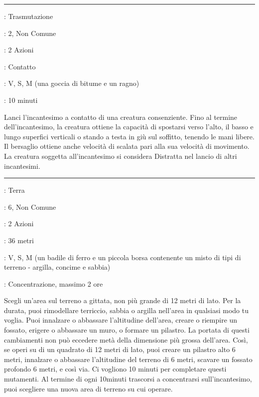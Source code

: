 \begin{multicols}{2}
\smallskip\noindent\rule{\linewidth}{2pt} \hypertarget{Movimenti del Ragno}{}\medskip{}
\noindent
\begin{description}[noitemsep, topsep=0pt, parsep=0pt, partopsep=0pt, leftmargin=0cm, labelwidth=2.8cm]
	\item[\textbf{Lista di Magia}]: Trasmutazione
	\item[\textbf{Livello}]: 2, Non Comune
	\item[\textbf{T. di Lancio}]: 2 Azioni
	\item[\textbf{Gittata}]: Contatto
	\item[\textbf{Componenti}]: V, S, M (una goccia di bitume e un ragno)
	\item[\textbf{Durata}]: 10 minuti
\end{description}

Lanci l'incantesimo a contatto di una creatura consenziente. Fino al termine dell'incantesimo, la creatura ottiene la capacità di spostarsi verso l'alto, il basso e lungo superfici verticali o stando a testa in giù sul soffitto, tenendo le mani libere. Il bersaglio ottiene anche velocità di scalata pari alla sua velocità di movimento. La creatura soggetta all'incantesimo si considera Distratta nel lancio di altri incantesimi.

\smallskip\noindent\rule{\linewidth}{2pt} \hypertarget{Muovere il Terreno}{}\medskip{}
\noindent
\begin{description}[noitemsep, topsep=0pt, parsep=0pt, partopsep=0pt, leftmargin=0cm, labelwidth=2.8cm]
	\item[\textbf{Lista di Magia}]: Terra
	\item[\textbf{Livello}]: 6, Non Comune
	\item[\textbf{T. di Lancio}]: 2 Azioni
	\item[\textbf{Gittata}]: 36 metri
	\item[\textbf{Componenti}]: V, S, M (un badile di ferro e un piccola borsa contenente un misto di tipi di terreno - argilla, concime e sabbia)
	\item[\textbf{Durata}]: Concentrazione, massimo 2 ore
\end{description}

Scegli un'area sul terreno a gittata, non più grande di 12 metri di lato. Per la durata, puoi rimodellare terriccio, sabbia o argilla nell'area in qualsiasi modo tu voglia. Puoi innalzare o abbassare l'altitudine dell'area, creare o riempire un fossato, erigere o abbassare un muro, o formare un pilastro. La portata di questi cambiamenti non può eccedere metà della dimensione più grossa dell'area. Così, se operi su di un quadrato di 12 metri di lato, puoi creare un pilastro alto 6 metri, innalzare o abbassare l'altitudine del terreno di 6 metri, scavare un fossato profondo 6 metri, e così via. Ci vogliono 10 minuti per completare questi mutamenti. Al termine di ogni 10minuti trascorsi a concentrarsi sull'incantesimo, puoi scegliere una nuova area di terreno su cui operare.


\end{multicols}
